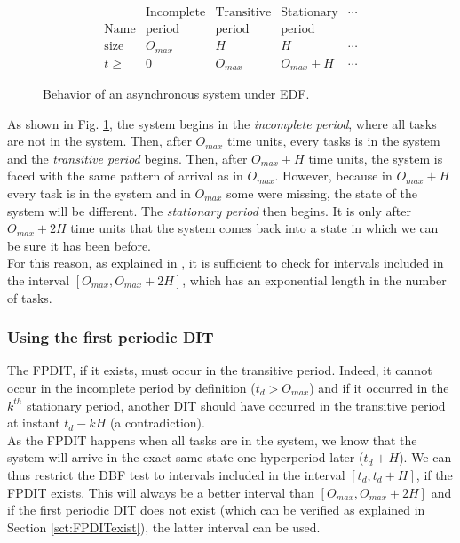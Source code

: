 \documentclass[conference]{IEEEtran}
\begin{document}
\begin{figure}[h]
  \[
    \begin{array}{r||c|c|c|l}
      & \text{Incomplete} & \text{Transitive} & \text{Stationary} & \cdots \\
      \text{Name} & \text{period} & \text{period} & \text{period}  & \\
      \hline
      \text{size} & O_{max} & H & H & \cdots \\
      \hline
      t \geqslant & 0 & O_{max} & O_{max} + H & \cdots
    \end{array}
  \]
  \begin{center}
  \caption{Behavior of an asynchronous system under EDF.}
  \label{fig:asyncBehavior}
  \end{center}
\end{figure}

As shown in Fig. \ref{fig:asyncBehavior}, the system begins in the \emph{incomplete period}, where all tasks are not in the system. Then, after $O_{max}$ time units, every tasks is in the system and the \emph{transitive period} begins. Then, after $O_{max} + H$ time units, the system is faced with the same pattern of arrival as in $O_{max}$. However, because in $O_{max} + H$ every task is in the system and in $O_{max}$ some were missing, the state of the system will be different. The \emph{stationary period} then begins. It is only after $O_{max} + 2H$ time units that the system comes back into a state in which we can be sure it has been before.\\

For this reason, as explained in \cite{leung1982complexity}, it is sufficient to check for intervals included in the interval $[O_{max}, O_{max} + 2H]$, which has an exponential length in the number of tasks.

\subsubsection{Using the first periodic DIT}

The FPDIT, if it exists, must occur in the transitive period. Indeed, it cannot occur in the incomplete period by definition ($t_d > O_{max}$) and if it occurred in the $k^{th}$ stationary period, another DIT should have occurred in the transitive period at instant $t_d - k H$ (a contradiction).\\

As the FPDIT happens when all tasks are in the system, we know that the system will arrive in the exact same state one hyperperiod later ($t_d + H$). We can thus restrict the DBF test to intervals included in the interval $[t_d, t_d + H]$, if the FPDIT exists. This will always be a better interval than $[O_{max}, O_{max} + 2H]$ and if the first periodic DIT does not exist (which can be verified as explained in Section \ref{sct:FPDITexist}), the latter interval can be used.\\
\end{document}
